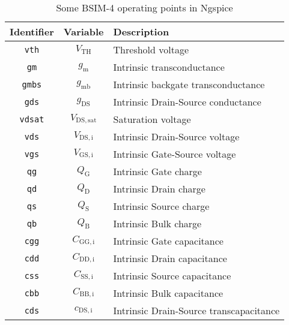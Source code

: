 \documentclass{article}[11pt]
\begin{document}
\begin{table}[H]
\centering
\caption{Some BSIM-4 operating points in Ngspice}
\begin{tabular}{ccl}
\toprule
\textbf{Identifier}  & \textbf{Variable}      & \textbf{Description}                                   \\ \midrule
\texttt{vth}         & $V_{\mathrm{TH}}$      & Threshold voltage                                      \\ 
\texttt{gm}          & $g_{\mathrm{m}}$       & Intrinsic transconductance                             \\ 
\texttt{gmbs}        & $g_{\mathrm{mb}}$      & Intrinsic backgate transconductance                    \\ 
\texttt{gds}         & $g_{\mathrm{DS}}$      & Intrinsic Drain-Source conductance                     \\ 
\texttt{vdsat}       & $V_{\mathrm{DS,sat}}$  & Saturation voltage                                     \\ 
\texttt{vds}         & $V_{\mathrm{DS,i}}$    & Intrinsic Drain-Source voltage                         \\ 
\texttt{vgs}         & $V_{\mathrm{GS,i}}$    & Intrinsic Gate-Source voltage                          \\ 
\texttt{qg}          & $Q_{\mathrm{G}}$       & Intrinsic Gate charge                                  \\ 
\texttt{qd}          & $Q_{\mathrm{D}}$       & Intrinsic Drain charge                                 \\ 
\texttt{qs}          & $Q_{\mathrm{S}}$       & Intrinsic Source charge                                \\ 
\texttt{qb}          & $Q_{\mathrm{B}}$       & Intrinsic Bulk charge                                  \\ 
\texttt{cgg}         & $C_{\mathrm{GG,i}}$    & Intrinsic Gate capacitance                             \\ 
\texttt{cdd}         & $C_{\mathrm{DD,i}}$    & Intrinsic Drain capacitance                            \\ 
\texttt{css}         & $C_{\mathrm{SS,i}}$    & Intrinsic Source capacitance                           \\ 
\texttt{cbb}         & $C_{\mathrm{BB,i}}$    & Intrinsic Bulk capacitance                             \\ 
\texttt{cds}         & $c_{\mathrm{DS,i}}$    & Intrinsic Drain-Source transcapacitance                \\ 

\end{tabular}
\end{table}
\end{document}
